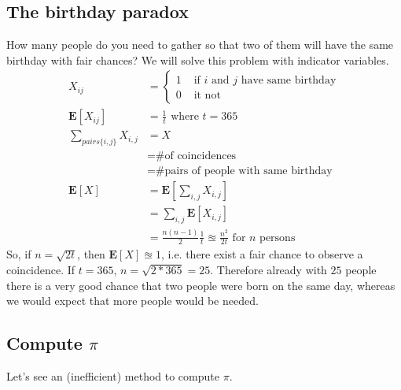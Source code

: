 \subsection{The birthday paradox}
How many people do you need to gather so that two of them will have the same birthday with fair chances? We will solve this problem with indicator variables.
\begin{align*}
X_{ij} &=
  \left\{
      \begin{aligned}
      	1 &\text{ if $i$ and $j$ have same birthday} \\
        0 &\text{ it not }
      \end{aligned}
    \right.\\
\mathbf{E}[X_{ij}] &= \frac{1}{t} \text{ where $t = 365$}\\
\sum_{pairs \{i,j\}} X_{i,j} &= X\\
&= \text{\# of coincidences}\\
&= \text{\# pairs of people with same birthday}\\
\mathbf{E}[X] &=  \mathbf{E}[\sum_{i,j} X_{i,j}] \\
&= \sum_{i,j}  \mathbf{E}[X_{i,j}] \\
&= \frac{n(n-1)}{2} \frac{1}{t} \approxeq \frac{n^2}{2t} \text{ for $n$ persons}
\end{align*}
So, if $n = \sqrt{2t}$, then $\mathbf{E}[X] \approxeq 1$, i.e. there exist a fair chance to observe a coincidence. If $t = 365$, $n = \sqrt{2*365} = 25$. Therefore already with $25$ people there is a very good chance that two people were born on the same day, whereas we would expect that more people would be needed.



\subsection{Compute $\pi$}
Let's see an (inefficient) method to compute $\pi$.
